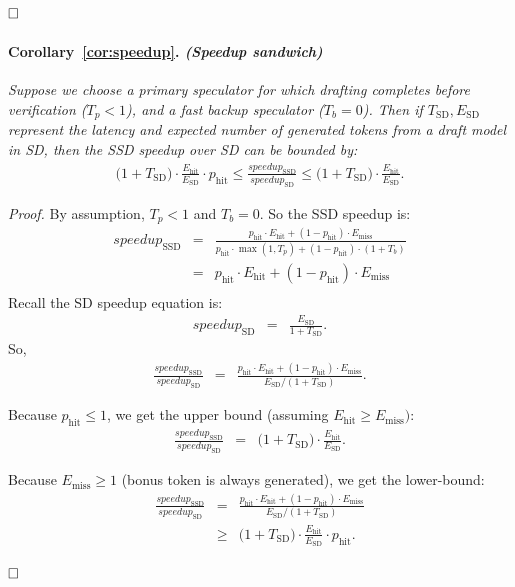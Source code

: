 $\hfill\square$
\paragraph{Corollary~\ref{cor:speedup}. \textit{(Speedup sandwich)}}
\textit{Suppose we choose a primary speculator for which drafting completes before verification ($T_p < 1$), and a fast backup speculator ($T_b = 0$).
Then if $T_{\mathrm{SD}}, E_{\mathrm{SD}}$ represent the latency and expected number of generated tokens from a draft model in SD, then the SSD speedup over SD can be bounded by:}
\begin{eqnarray*}
\Big(1 + T_{\mathrm{SD}}\Big) \cdot \frac{E_{\mathrm{hit}}}{E_{\mathrm{SD}}} \cdot p_{\mathrm{hit}}  \leq \frac{speedup_{\mathrm{SSD}}}{speedup_{\mathrm{SD}}} \leq \Big(1 + T_{\mathrm{SD}}\Big) \cdot \frac{E_{\mathrm{hit}}}{E_{\mathrm{SD}}}.
\end{eqnarray*}

\textit{Proof.} By assumption, $T_p < 1$ and $T_b = 0$. So the SSD speedup is:
\begin{eqnarray*}
speedup_{\mathrm{SSD}} &=& \frac{p_{\mathrm{hit}} \cdot E_{\mathrm{hit}} + (1-p_{\mathrm{hit}}) \cdot E_{\mathrm{miss}}}{p_{\mathrm{hit}} \cdot \max(1, T_p) + (1-p_{\mathrm{hit}}) \cdot (1 + T_b)} \\
&=& p_{\mathrm{hit}} \cdot E_{\mathrm{hit}} + (1-p_{\mathrm{hit}}) \cdot E_{\mathrm{miss}} \\
\end{eqnarray*}
Recall the SD speedup equation is:
\begin{eqnarray*}
speedup_{\mathrm{SD}} &=& \frac{E_{\mathrm{SD}}}{1 + T_{\mathrm{SD}}}.
\end{eqnarray*}
So,
\begin{eqnarray*}
\frac{speedup_{\mathrm{SSD}}}{speedup_{\mathrm{SD}}} &=& \frac{p_{\mathrm{hit}} \cdot E_{\mathrm{hit}} + (1-p_{\mathrm{hit}}) \cdot E_{\mathrm{miss}}}{E_{\mathrm{SD}} / (1 + T_{\mathrm{SD}})}.
\end{eqnarray*}

Because $p_{\mathrm{hit}} \leq 1$, we get the upper bound (assuming $E_{\mathrm{hit}} \geq E_{\mathrm{miss}})$:
\begin{eqnarray*}
\frac{speedup_{\mathrm{SSD}}}{speedup_{\mathrm{SD}}} &=& \Big(1 + T_{\mathrm{SD}}\Big) \cdot \frac{E_{\mathrm{hit}}}{E_{\mathrm{SD}}}.
\end{eqnarray*}

Because $E_{\mathrm{miss}} \geq 1$ (bonus token is always generated), we get the lower-bound:
\begin{eqnarray*}
\frac{speedup_{\mathrm{SSD}}}{speedup_{\mathrm{SD}}} &=& \frac{p_{\mathrm{hit}} \cdot E_{\mathrm{hit}} + (1-p_{\mathrm{hit}}) \cdot E_{\mathrm{miss}}}{E_{\mathrm{SD}} / (1 + T_{\mathrm{SD}})} \\
&\geq& \Big(1 + T_{\mathrm{SD}}\Big) \cdot \frac{E_{\mathrm{hit}}}{E_{\mathrm{SD}}} \cdot p_{\mathrm{hit}}.
\end{eqnarray*}

$\hfill\square$
